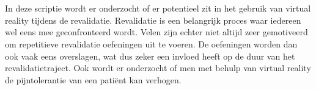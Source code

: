 
%
%

%



\chapter*{}

In deze scriptie wordt er onderzocht of er potentieel zit in het gebruik van virtual reality tijdens de revalidatie. Revalidatie is een belangrijk proces waar iedereen wel eens mee geconfronteerd wordt. Velen zijn echter niet altijd zeer gemotiveerd om repetitieve revalidatie oefeningen uit te voeren. De oefeningen worden dan ook vaak eens overslagen, wat dus zeker een invloed heeft op de duur van het revalidatietraject.
Ook wordt er onderzocht of men met behulp van virtual reality de pijntolerantie van een patiënt kan verhogen.

